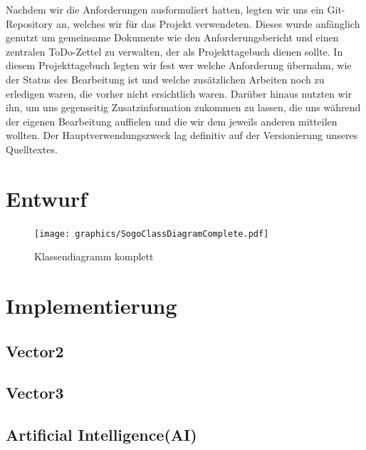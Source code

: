 \documentclass[a4paper]{scrartcl}
\begin{document}
Nachdem wir die Anforderungen ausformuliert hatten, legten wir uns ein Git-Repository an, welches wir für das Projekt verwendeten. Dieses wurde anfänglich genutzt um gemeinsame Dokumente wie den Anforderungsbericht und einen zentralen ToDo-Zettel zu verwalten, der als Projekttagebuch dienen sollte. In diesem Projekttagebuch legten wir fest wer welche Anforderung übernahm, wie der Status des Bearbeitung ist und welche zusätzlichen Arbeiten noch zu erledigen waren, die vorher nicht ersichtlich waren. Darüber hinaus nutzten wir ihn, um uns gegenseitig Zusatzinformation zukommen zu lassen, die uns während der eigenen Bearbeitung auffielen und die wir dem jeweils anderen mitteilen wollten. Der Hauptverwendungszweck lag definitiv auf der Versionierung unseres Quelltextes.

\section{Entwurf}\label{ch:Entwurf}

\begin{figure}[H]
 \centering
 \texttt{[image: graphics/SogoClassDiagramComplete.pdf]}
 \caption{Klassendiagramm komplett}
 \label{fig:ClassdiagramComplete}
\end{figure}

\section{Implementierung}\label{ch:Implementierung}


\subsection{Vector2}\label{ch:Vector2}
\subsection{Vector3}\label{ch:Vector3}
\subsection{Artificial Intelligence(AI)}\label{ch:AI}
\end{document}
